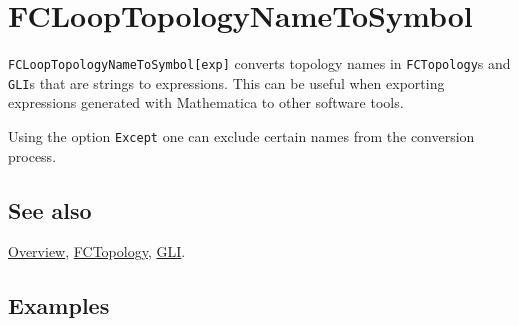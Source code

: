 \documentclass[../FeynCalcManual.tex]{subfiles}
\begin{document}
\hypertarget{fclooptopologynametosymbol}{
\section{FCLoopTopologyNameToSymbol}\label{fclooptopologynametosymbol}}

\texttt{FCLoopTopologyNameToSymbol[\allowbreak{}exp]} converts topology
names in \texttt{FCTopology}s and \texttt{GLI}s that are strings to
expressions. This can be useful when exporting expressions generated
with Mathematica to other software tools.

Using the option \texttt{Except} one can exclude certain names from the
conversion process.

\subsection{See also}

\hyperlink{toc}{Overview}, \hyperlink{fctopology}{FCTopology},
\hyperlink{gli}{GLI}.

\subsection{Examples}

\begin{Shaded}
\begin{Highlighting}[]
\OperatorTok{[}\OperatorTok{[}\OperatorTok{,} \OperatorTok{\{}\OperatorTok{,} \OperatorTok{,} \OperatorTok{\}]]} \SpecialCharTok{//} 
\end{Highlighting}
\end{Shaded}

\begin{Shaded}
\begin{Highlighting}[]
\OperatorTok{[}\OperatorTok{,} \OperatorTok{\{}\OperatorTok{,} \OperatorTok{,} \OperatorTok{\}]}
\end{Highlighting}
\end{Shaded}

\begin{Shaded}
\begin{Highlighting}[]
\OperatorTok{[}\OperatorTok{[}\OperatorTok{,} \OperatorTok{\{}\OperatorTok{[\{}\OperatorTok{,} \OperatorTok{\}],}\OperatorTok{[\{}\SpecialCharTok{{-}} \OperatorTok{,} \OperatorTok{\}]\},} \OperatorTok{\{}\OperatorTok{\},} \OperatorTok{\{}\OperatorTok{\},} \OperatorTok{\{\},} \OperatorTok{\{\}]]} \SpecialCharTok{//} 
\end{Highlighting}
\end{Shaded}
\end{document}
